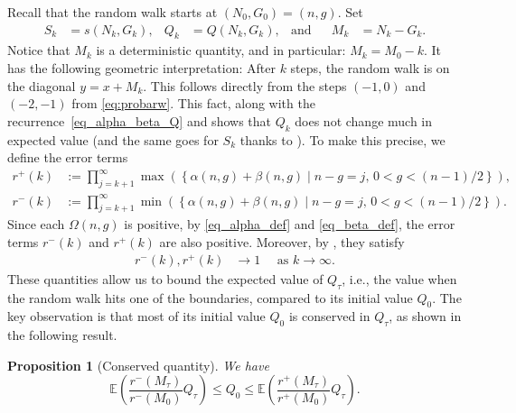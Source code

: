 \documentclass[a4paper,12pt]{article}
\newtheorem{proposition}[theorem]{Proposition}
\theoremstyle{definition}
\begin{document}
Recall that the random walk starts at $(N_0,G_0)=(n,g)$. Set 
\begin{align*}
    S_k&=s(N_k,G_k), &
    Q_k&=Q(N_k,G_k), & \text{and} &&
    M_k&=N_k-G_k. 
\end{align*}
Notice that $M_k$ is a deterministic quantity, and in particular: $M_k=M_0-k$. 
It has the following geometric interpretation:
After $k$ steps, the random walk is on the diagonal $y = x + M_k$.
This follows directly from the steps $(-1,0)$ and $(-2,-1)$ from \eqref{eq:probarw}.
This fact, along with the recurrence~\eqref{eq_alpha_beta_Q} and  shows that $Q_k$ does not change much in expected value (and the same goes for $S_k$ thanks to ). To make this precise, we define the error terms
\begin{align*}
    r^{+}(k)&:=\prod_{j=k+1}^{\infty}\max\left(\left\{ \alpha(n,g)+\beta(n,g)  \mid n-g=j, \, 0<g<(n-1)/2 \right\}\right),\\
    r^{-}(k)&:=\prod_{j=k+1}^{\infty}\min(\left\{ \alpha(n,g)+\beta(n,g) \mid n-g=j, \, 0<g<(n-1)/2 \right\}).
\end{align*}
Since each $\Omega(n,g)$ is positive, by \eqref{eq_alpha_def} and \eqref{eq_beta_def}, the error terms $r^{-}(k)$ and $r^{+}(k)$ are also positive. Moreover, by , they satisfy 
\begin{align}
    \label{eq:rpm_limit_bhr}
    r^{-}(k),r^{+}(k) &\to 1 \quad \text{ as $k\to\infty$}.
\end{align}
These quantities allow us to bound the expected value of $Q_\tau$, i.e., the value when the random walk hits one of the boundaries, compared to its initial value $Q_0$.
The key observation is that most of its initial value $Q_0$ is conserved in $Q_\tau$, as shown in the following result.

\begin{proposition}[Conserved quantity]
\label{prop_E(Q)}
We have 
    \[
        \mathbb{E}\left( \frac{r^{-}(M_{\tau})}{r^{-}(M_{0})}Q_\tau \right) \leq Q_0 \leq \mathbb{E}\left( \frac{r^{+}(M_{\tau})}{r^{+}(M_{0})}Q_\tau \right).
    \]
\end{proposition}
\end{document}
